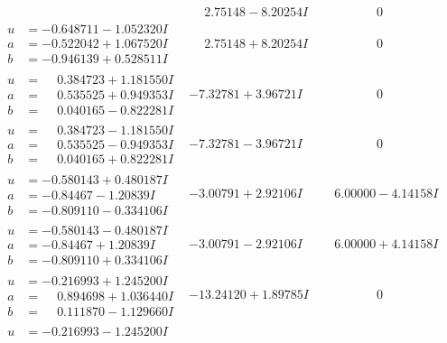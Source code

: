 \documentclass[1p]{elsarticle_modified}
\theoremstyle{definition}
\begin{document}
$$\begin{array}{c|c|c}
 & \phantom{-}2.75148 - 8.20254 I & \phantom{-0.000000 } 0 \\ \hline\begin{aligned}
u &= -0.648711 - 1.052320 I \\
a &= -0.522042 + 1.067520 I \\
b &= -0.946139 + 0.528511 I\end{aligned}
 & \phantom{-}2.75148 + 8.20254 I & \phantom{-0.000000 } 0 \\ \hline\begin{aligned}
u &= \phantom{-}0.384723 + 1.181550 I \\
a &= \phantom{-}0.535525 + 0.949353 I \\
b &= \phantom{-}0.040165 - 0.822281 I\end{aligned}
 & -7.32781 + 3.96721 I & \phantom{-0.000000 } 0 \\ \hline\begin{aligned}
u &= \phantom{-}0.384723 - 1.181550 I \\
a &= \phantom{-}0.535525 - 0.949353 I \\
b &= \phantom{-}0.040165 + 0.822281 I\end{aligned}
 & -7.32781 - 3.96721 I & \phantom{-0.000000 } 0 \\ \hline\begin{aligned}
u &= -0.580143 + 0.480187 I \\
a &= -0.84467 - 1.20839 I \\
b &= -0.809110 - 0.334106 I\end{aligned}
 & -3.00791 + 2.92106 I & \phantom{-}6.00000 - 4.14158 I \\ \hline\begin{aligned}
u &= -0.580143 - 0.480187 I \\
a &= -0.84467 + 1.20839 I \\
b &= -0.809110 + 0.334106 I\end{aligned}
 & -3.00791 - 2.92106 I & \phantom{-}6.00000 + 4.14158 I \\ \hline\begin{aligned}
u &= -0.216993 + 1.245200 I \\
a &= \phantom{-}0.894698 + 1.036440 I \\
b &= \phantom{-}0.111870 - 1.129660 I\end{aligned}
 & -13.24120 + 1.89785 I & \phantom{-0.000000 } 0 \\ \hline\begin{aligned}
u &= -0.216993 - 1.245200 I \\

\end{aligned}
\end{array}$$
\end{document}
